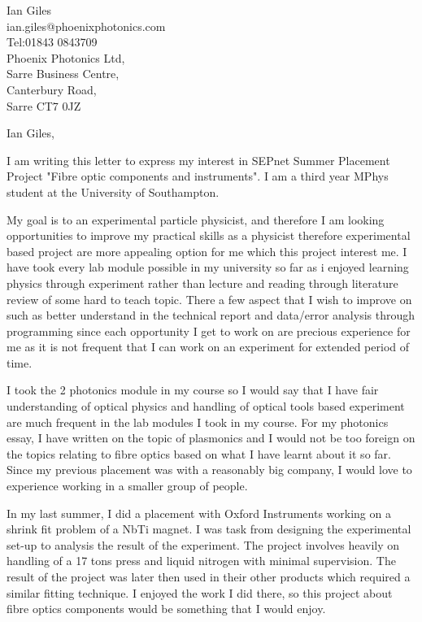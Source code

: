 \documentclass[11pt]{letter} %
\begin{document}

\begin{letter}{Ian Giles\\ian.giles@phoenixphotonics.com\\Tel:01843 0843709\\Phoenix Photonics Ltd,\\Sarre Business Centre,\\Canterbury Road,\\Sarre CT7 0JZ}


\opening{Ian Giles,} 

I am writing this letter to express my interest in SEPnet Summer Placement Project "Fibre optic components and instruments". I am a third year MPhys student at the University of Southampton.

My goal is to an experimental particle physicist, and therefore I am looking opportunities to improve my practical skills as a physicist therefore experimental based project are more appealing option for me which this project interest me. I have took every lab module possible in my university so far as i enjoyed learning physics through experiment rather than lecture and reading through literature review of some hard to teach topic. There a few aspect that I wish to improve on such as better understand in the technical report and data/error analysis through programming since each opportunity I get to work on are precious experience for me as it is not frequent that I can work on an experiment for extended period of time.

I took the 2 photonics module in my course so I would say that I have fair understanding of optical physics and handling of optical tools based experiment are much frequent in the lab modules I took in my course. For my photonics essay, I have written on the topic of plasmonics and I would not be too foreign on the topics relating to fibre optics based on what I have learnt about it so far. Since my previous placement was with a reasonably big company, I would love to experience working in a smaller group of people.

In my last summer, I did a placement with Oxford Instruments working on a shrink fit problem of a NbTi magnet. I was task from designing the experimental set-up to analysis the result of the experiment. The project involves heavily on handling of a 17 tons press and liquid nitrogen with minimal supervision. The result of the project was later then used in their other products which required a similar fitting technique. I enjoyed the work I did there, so this project about fibre optics components would be something that I would enjoy.


\end{letter}
\end{document}
